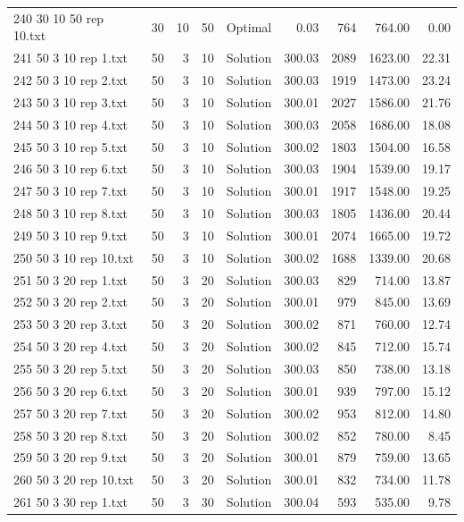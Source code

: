 \begin{longtable}{lrrllrrrr}
240 30 10 50 rep 10.txt & 30 & 10 & 50 & Optimal &  0.03 & 764 & 764.00 &  0.00\\
241 50 3 10 rep 1.txt & 50 & 3 & 10 & Solution & 300.03 & 2089 & 1623.00 & 22.31\\
242 50 3 10 rep 2.txt & 50 & 3 & 10 & Solution & 300.03 & 1919 & 1473.00 & 23.24\\
243 50 3 10 rep 3.txt & 50 & 3 & 10 & Solution & 300.01 & 2027 & 1586.00 & 21.76\\
244 50 3 10 rep 4.txt & 50 & 3 & 10 & Solution & 300.03 & 2058 & 1686.00 & 18.08\\
245 50 3 10 rep 5.txt & 50 & 3 & 10 & Solution & 300.02 & 1803 & 1504.00 & 16.58\\
246 50 3 10 rep 6.txt & 50 & 3 & 10 & Solution & 300.03 & 1904 & 1539.00 & 19.17\\
247 50 3 10 rep 7.txt & 50 & 3 & 10 & Solution & 300.01 & 1917 & 1548.00 & 19.25\\
248 50 3 10 rep 8.txt & 50 & 3 & 10 & Solution & 300.03 & 1805 & 1436.00 & 20.44\\
249 50 3 10 rep 9.txt & 50 & 3 & 10 & Solution & 300.01 & 2074 & 1665.00 & 19.72\\
250 50 3 10 rep 10.txt & 50 & 3 & 10 & Solution & 300.02 & 1688 & 1339.00 & 20.68\\
251 50 3 20 rep 1.txt & 50 & 3 & 20 & Solution & 300.03 & 829 & 714.00 & 13.87\\
252 50 3 20 rep 2.txt & 50 & 3 & 20 & Solution & 300.01 & 979 & 845.00 & 13.69\\
253 50 3 20 rep 3.txt & 50 & 3 & 20 & Solution & 300.02 & 871 & 760.00 & 12.74\\
254 50 3 20 rep 4.txt & 50 & 3 & 20 & Solution & 300.02 & 845 & 712.00 & 15.74\\
255 50 3 20 rep 5.txt & 50 & 3 & 20 & Solution & 300.03 & 850 & 738.00 & 13.18\\
256 50 3 20 rep 6.txt & 50 & 3 & 20 & Solution & 300.01 & 939 & 797.00 & 15.12\\
257 50 3 20 rep 7.txt & 50 & 3 & 20 & Solution & 300.02 & 953 & 812.00 & 14.80\\
258 50 3 20 rep 8.txt & 50 & 3 & 20 & Solution & 300.02 & 852 & 780.00 &  8.45\\
259 50 3 20 rep 9.txt & 50 & 3 & 20 & Solution & 300.01 & 879 & 759.00 & 13.65\\
260 50 3 20 rep 10.txt & 50 & 3 & 20 & Solution & 300.01 & 832 & 734.00 & 11.78\\
261 50 3 30 rep 1.txt & 50 & 3 & 30 & Solution & 300.04 & 593 & 535.00 &  9.78\\

\end{longtable}
